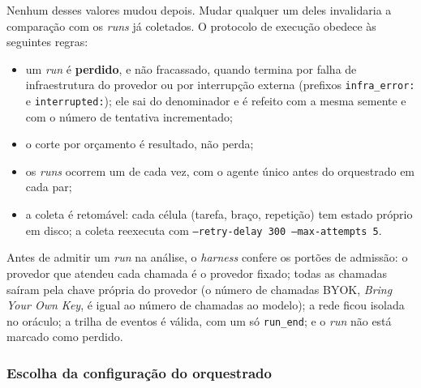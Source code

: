 Nenhum desses valores mudou depois. Mudar qualquer um deles invalidaria a comparação com os \textit{runs} já coletados. O protocolo de execução obedece às seguintes regras:

\begin{itemize}
    \item um \textit{run} é \textbf{perdido}, e não fracassado, quando termina por falha de infraestrutura do provedor ou por interrupção externa (prefixos \texttt{infra\_error:} e \texttt{interrupted:}); ele sai do denominador e é refeito com a mesma semente e com o número de tentativa incrementado;
    \item o corte por orçamento é resultado, não perda;
    \item os \textit{runs} ocorrem um de cada vez, com o agente único antes do orquestrado em cada par;
    \item a coleta é retomável: cada célula (tarefa, braço, repetição) tem estado próprio em disco; a coleta reexecuta com \texttt{--retry-delay 300 --max-attempts 5}.
\end{itemize}

Antes de admitir um \textit{run} na análise, o \textit{harness} confere os portões de admissão: o provedor que atendeu cada chamada é o provedor fixado; todas as chamadas saíram pela chave própria do provedor (o número de chamadas BYOK, \textit{Bring Your Own Key}, é igual ao número de chamadas ao modelo); a rede ficou isolada no oráculo; a trilha de eventos é válida, com um só \texttt{run\_end}; e o \textit{run} não está marcado como perdido.

\subsubsection{Escolha da configuração do orquestrado}

